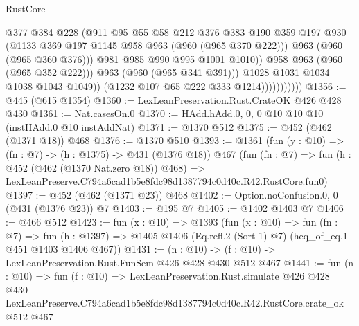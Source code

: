 \begin{lexlean}{RustCore}
\begin{coremodule}
                                    @377
                                    @384
                                    @228
                                    (@911
                                      @95
                                      @55
                                      @58
                                      @212
                                      @376
                                      @383
                                      @190
                                      @359
                                      @197
                                      @930
                                      (@1133 @369 @197 @1145 @958 @963 (@960 (@965 @370 @222)))
                                      @963
                                      (@960 (@965 @360 @376)))
                                    @981
                                    @985
                                    @990
                                    @995
                                    @1001
                                    @1010))
                                @958
                                @963
                                (@960 (@965 @352 @222)))
                              @963
                              (@960 (@965 @341 @391)))
                            @1028
                            @1031
                            @1034
                            @1038
                            @1043
                            @1049))
                        (@1232 @107 @65 @222 @333 @1214)))))))))))
@1356 := @445 (@615 @1354)
@1360 := LexLeanPreservation.Rust.CrateOK @426 @428 @430
@1361 := Nat.casesOn.{0}
@1370 := HAdd.hAdd.{0, 0, 0} @10 @10 @10 (instHAdd.{0} @10 instAddNat)
@1371 := @1370 @512
@1375 := @452 (@462 (@1371 @18)) @468
@1376 := @1370 @510
@1393 := @1361
    (fun (y : @10) => (fn : @7) -> (h : @1375) -> @431 (@1376 @18))
    @467
    (fun (fn : @7) =>
    fun (h : @452 (@462 (@1370 Nat.zero @18)) @468) =>
    LexLeanPreserve.C794a6cad1b5e8fdc98d1387794c0d40c.R42.RustCore.fun0)
@1397 := @452 (@462 (@1371 @23)) @468
@1402 := Option.noConfusion.{0, 0} (@431 (@1376 @23)) @7
@1403 := @195 @7
@1405 := @1402 @1403 @7
@1406 := @466 @512
@1423 := fun (x : @10) =>
  @1393
    (fun (x : @10) =>
    fun (fn : @7) =>
    fun (h : @1397) => @1405 @1406 (Eq.refl.{2} (Sort 1) @7) (heq_of_eq.{1} @451 @1403 @1406 @467))
@1431 := (n : @10) -> (f : @10) -> LexLeanPreservation.Rust.FunSem @426 @428 @430 @512 @467
@1441 := fun (n : @10) =>
  fun (f : @10) =>
  LexLeanPreservation.Rust.simulate
    @426
    @428
    @430
    LexLeanPreserve.C794a6cad1b5e8fdc98d1387794c0d40c.R42.RustCore.crate_ok
    @512
    @467
\end{coremodule}
\end{lexlean}
